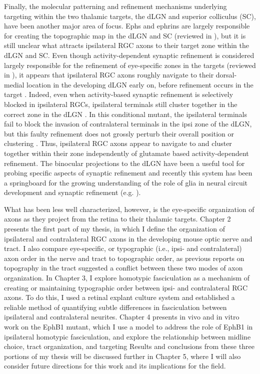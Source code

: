 Finally, the molecular patterning and refinement mechanisms underlying targeting within the two thalamic targets, the dLGN and superior colliculus (SC), have been another major area of focus.
Ephs and ephrins are largely responsible for creating the topographic map in the dLGN and SC (reviewed in ), but it is still unclear what attracts ipsilateral RGC axons to their target zone within the dLGN and SC.
Even though activity-dependent synaptic refinement is considered largely responsible for the refinement of eye-specific zones in the targets (reviewed in ), it appears that ipsilateral RGC axons roughly navigate to their dorsal-medial location in the developing dLGN early on, before refinement occurs in the target \cite{jaubert2005structural}.
Indeed, even when activity-based synaptic refinement is selectively blocked in ipsilateral RGCs, ipsilateral terminals still cluster together in the correct zone in the dLGN \cite{koch2011pathway}.
In this conditional mutant, the ipsilateral terminals fail to block the invasion of contralateral terminals in the ipsi zone of the dLGN, but this faulty refinement does not grossly perturb their overall position or clustering \cite{koch2011pathway}.
Thus, ipsilateral RGC axons appear to navigate to and cluster together within their zone independently of glutamate based activity-dependent refinement.
The binocular projections to the dLGN have been a useful tool for probing specific aspects of synaptic refinement and recently this system has been a springboard for the growing understanding of the role of glia in neural circuit development and synaptic refinement (e.g. ).

What has been less well characterized, however, is the eye-specific organization of axons as they project from the retina to their thalamic targets.
Chapter 2 presents the first part of my thesis, in which I define the organization of ipsilateral and contralateral RGC axons in the developing mouse optic nerve and tract.
I also compare eye-specific, or typographic (i.e., ipsi- and contralateral) axon order in the nerve and tract to topographic order, as previous reports on topography in the tract suggested a conflict between these two modes of axon organization.
In Chapter 3, I explore homotypic fasciculation as a mechanism of creating or maintaining typographic order between ipsi- and contralateral RGC axons.
To do this, I used a retinal explant culture system and established a reliable method of quantifying subtle differences in fasciculation between ipsilateral and contralateral neurites.
Chapter 4 presents in vivo and in vitro work on the EphB1 mutant, which I use a model to address the role of EphB1 in ipsilateral homotypic fasciculation, and explore the relationship between midline choice, tract organization, and targeting
Results and conclusions from these three portions of my thesis will be discussed further in Chapter 5, where I will also consider future directions for this work and its implications for the field.

